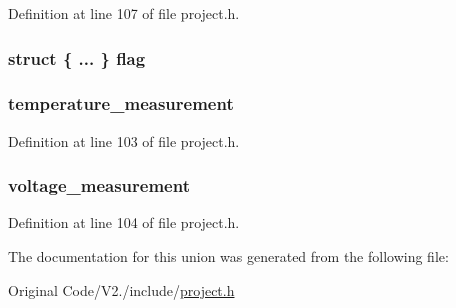 \-Definition at line 107 of file project.\-h.

\hypertarget{unions__request__flags_aa7856aa1edd0e3f26421a3283901e2e7}{
\subsubsection[{flag}]{\setlength{\rightskip}{0pt plus 5cm}struct \{ ... \}   {\bf flag}}}\label{unions__request__flags_aa7856aa1edd0e3f26421a3283901e2e7}
\hypertarget{unions__request__flags_a851b146818d28e82773d793261389b80}{
\subsubsection[{temperature\-\_\-measurement}]{ {\bf temperature\-\_\-measurement}}}\label{unions__request__flags_a851b146818d28e82773d793261389b80}


\-Definition at line 103 of file project.\-h.

\hypertarget{unions__request__flags_a34ac0ac4c8f59b9ed016337d132c0961}{
\subsubsection[{voltage\-\_\-measurement}]{ {\bf voltage\-\_\-measurement}}}\label{unions__request__flags_a34ac0ac4c8f59b9ed016337d132c0961}


\-Definition at line 104 of file project.\-h.



\-The documentation for this union was generated from the following file\-:\begin{DoxyCompactItemize}
\item 
\-Original Code/\-V2./include/\hyperlink{project_8h}{project.\-h}\end{DoxyCompactItemize}
